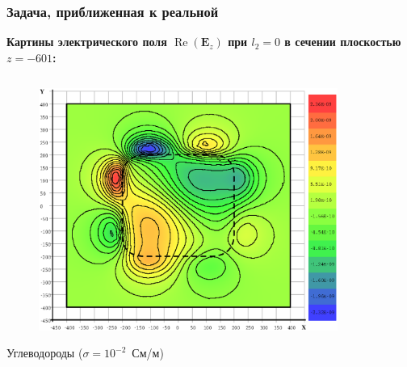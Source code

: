 \documentclass[aspectratio=43,usepdftitle=false]{beamer}
\renewcommand{\Re}{\mathop{\mathrm{Re}}\nolimits}
\newcommand{\MakeTitle}[1]{\frametitle{\hspace{1.5em}\textbf{#1} \hfill \insertframenumber{} }}
\begin{document}

\begin{frame}
	\MakeTitle{Задача, приближенная к реальной}
	\textbf{Картины электрического поля $\Re(\mathbf{E}_z)$ при $l_2 = 0$ в сечении плоскостью $z=-601$:}
	\begin{columns}[t,totalwidth=\linewidth]
		\hspace{-0.07\linewidth}
		\begin{column}{.5\linewidth}
			\vspace{-2.75em}
			\begin{figure}[H]
				\includegraphics[width=1.1\textwidth,height=1.1\textheight,keepaspectratio]{0_no_z=-601_EzR.eps}
			\end{figure}
			\begin{center}
				\vspace{-1em}
				\tiny{Углеводороды ($\sigma = 10^{-2}$~См/м)}
			\end{center}
		\end{column}
		\begin{column}{.5\linewidth}
			\vspace{-2.75em}
			\begin{figure}[H]

\end{figure}
\end{column}
\end{columns}
\end{frame}
\end{document}
